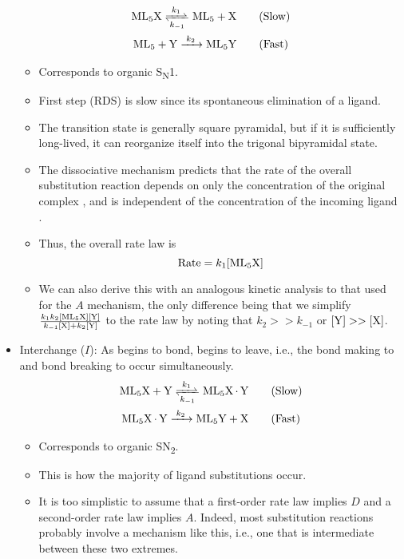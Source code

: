 \documentclass[../notes.tex]{subfiles}
\begin{document}
\begin{itemize}
    \begin{gather*}
        \ce{ML5X <=>[$k_1$][$k_{-1}$] ML5 + X}\tag{Slow}\\
        \ce{ML5 + Y ->[$k_2$] ML5Y}\tag{Fast}
    \end{gather*}
    \begin{itemize}
        \item Corresponds to organic S\textsubscript{N}1.
        \item First step (RDS) is slow since its spontaneous elimination of a ligand.
        \item The transition state is generally square pyramidal, but if it is sufficiently long-lived, it can reorganize itself into the trigonal bipyramidal state.
        \item The dissociative mechanism predicts that the rate of the overall substitution reaction depends on only the concentration of  the original complex \ce{[ML5X]}, and is independent of the concentration of the incoming ligand \ce{[Y]}.
        \item Thus, the overall rate law is
        \begin{equation*}
            \text{Rate} = k_1\ce{[ML5X]}
        \end{equation*}
        \item We can also derive this with an analogous kinetic analysis to that used for the $A$ mechanism, the only difference being that we simplify $\frac{k_1k_2\ce{[ML5X][Y]}}{k_{-1}\ce{[X]}+k_2\ce{[Y]}}$ to the rate law by noting that $k_2>>k_{-1}$ or $\ce{[Y]}>>\ce{[X]}$.
    \end{itemize}
    \item Interchange ($I$): As  begins to bond,  begins to leave, i.e., the bond making to  and bond breaking to  occur simultaneously.
    \begin{gather*}
        \ce{ML5X + Y <=>[$k_1$][$k_{-1}$] ML5X*Y}\tag{Slow}\\
        \ce{ML5X*Y ->[$k_2$] ML5Y + X}\tag{Fast}
    \end{gather*}
    \begin{itemize}
        \item Corresponds to organic SN\textsubscript{2}.
        \item This is how the majority of ligand substitutions occur.
        \item It is too simplistic to assume that a first-order rate law implies $D$ and a second-order rate law implies $A$. Indeed, most substitution reactions probably involve a mechanism like this, i.e., one that is intermediate between these two extremes.

\end{itemize}
\end{itemize}
\end{document}

